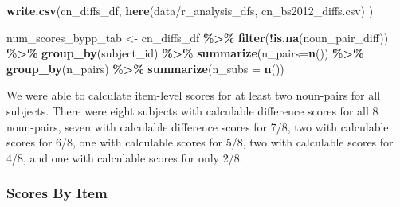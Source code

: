\documentclass[
  doc,floatsintext]{apa6}
\newenvironment{Shaded}{\begin{snugshade}}{\end{snugshade}}
\newcommand{\AttributeTok}[1]{\textcolor[rgb]{0.13,0.29,0.53}{#1}}
\newcommand{\FunctionTok}[1]{\textcolor[rgb]{0.13,0.29,0.53}{\textbf{#1}}}
\newcommand{\NormalTok}[1]{#1}
\newcommand{\OtherTok}[1]{\textcolor[rgb]{0.56,0.35,0.01}{#1}}
\newcommand{\SpecialCharTok}[1]{\textcolor[rgb]{0.81,0.36,0.00}{\textbf{#1}}}
\newcommand{\StringTok}[1]{\textcolor[rgb]{0.31,0.60,0.02}{#1}}
\begin{document}
\begin{Shaded}
\begin{Highlighting}[]
\FunctionTok{write.csv}\NormalTok{(cn\_diffs\_df, }\FunctionTok{here}\NormalTok{(}\StringTok{\textquotesingle{}data/r\_analysis\_dfs\textquotesingle{}}\NormalTok{, }
                                \StringTok{\textquotesingle{}cn\_bs2012\_diffs.csv\textquotesingle{}}\NormalTok{)}
\NormalTok{          )}
\end{Highlighting}
\end{Shaded}

\begin{Shaded}
\begin{Highlighting}[]
\NormalTok{num\_scores\_bypp\_tab }\OtherTok{\textless{}{-}}\NormalTok{ cn\_diffs\_df }\SpecialCharTok{\%\textgreater{}\%}
  \FunctionTok{filter}\NormalTok{(}\SpecialCharTok{!}\FunctionTok{is.na}\NormalTok{(noun\_pair\_diff)) }\SpecialCharTok{\%\textgreater{}\%}
  \FunctionTok{group\_by}\NormalTok{(subject\_id) }\SpecialCharTok{\%\textgreater{}\%}
  \FunctionTok{summarize}\NormalTok{(}\AttributeTok{n\_pairs=}\FunctionTok{n}\NormalTok{()) }\SpecialCharTok{\%\textgreater{}\%}
  \FunctionTok{group\_by}\NormalTok{(n\_pairs) }\SpecialCharTok{\%\textgreater{}\%}
  \FunctionTok{summarize}\NormalTok{(}\AttributeTok{n\_subs =} \FunctionTok{n}\NormalTok{())}
\end{Highlighting}
\end{Shaded}

We were able to calculate item-level scores for at least two noun-pairs for all subjects. There were eight subjects with calculable difference scores for all 8 noun-pairs, seven with calculable difference scores for 7/8, two with calculable scores for 6/8, one with calculable scores for 5/8, two with calculable scores for 4/8, and one with calculable scores for only 2/8.

\subsubsection{Scores By Item}\label{scores-by-item}
\end{document}
